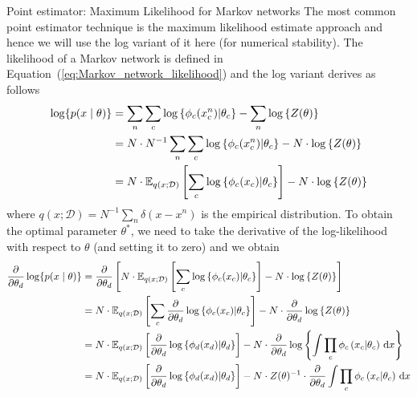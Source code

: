 \begin{topic}{.3cm}{Point estimator: Maximum Likelihood for Markov networks}
	The most common point estimator technique is the maximum likelihood estimate approach and hence we will use the log variant of it here (for numerical stability). %
	The likelihood of a Markov network is defined in Equation~(\ref{eq:Markov_network_likelihood}) and the log variant derives as follows %
	\begin{equation}
	\begin{aligned}
	\log\{p(x\mid\theta)\}
	&= \sum_n \sum_c \log\left\{ \phi_c(x_c^n) \middle| \theta_c \right\} - \sum_n \log\left\{ Z(\theta) \right\} \\
	&= N\cdot N^{-1} \sum_n \sum_c \log\left\{ \phi_c(x_c^n) \middle| \theta_c \right\} -  N\cdot \log\left\{ Z(\theta) \right\} \\
	&= N\cdot \E[q(x;\mathcal{D})]{\sum_c \log\left\{ \phi_c(x_c) \middle| \theta_c \right\}} -  N\cdot \log\left\{ Z(\theta) \right\} \\
	\end{aligned}
	\end{equation}
	where \ensuremath{q(x;\mathcal{D}) = N^{-1} \sum_n \delta(x-x^n)} is the empirical distribution. %
	To obtain the optimal parameter \ensuremath{\theta^*}, we need to take the derivative of the log-likelihood with respect to \ensuremath{\theta} (and setting it to zero) and we obtain %
	\begin{equation}
	\begin{aligned}
	\frac{\partial}{\partial\theta_d} \log\{p(x\mid\theta)\}
	&= \frac{\partial}{\partial\theta_d} \left[  N\cdot \E[q(x;\mathcal{D})]{\sum_c \log\left\{ \phi_c(x_c) \middle| \theta_c \right\}} -  N\cdot \log\left\{ Z(\theta) \right\}  \right] \\
	&= N\cdot \E[q(x;\mathcal{D})]{\sum_c \frac{\partial}{\partial\theta_d} \log\left\{ \phi_c(x_c) \middle| \theta_c \right\}} -  N\cdot \frac{\partial}{\partial\theta_d} \log\left\{ Z(\theta) \right\} \\
	&= N\cdot \E[q(x;\mathcal{D})]{\frac{\partial}{\partial\theta_d} \log\left\{ \phi_d(x_d) \middle| \theta_d \right\}} -  N\cdot \frac{\partial}{\partial\theta_d} \log\left\{ \int \prod_c \phi_c\left(x_c \middle| \theta_c \right) \,\mathrm{d}x \right\} \\
	&= N\cdot \E[q(x;\mathcal{D})]{\frac{\partial}{\partial\theta_d} \log\left\{ \phi_d(x_d) \middle| \theta_d \right\}} %
		- N\cdot Z(\theta)^{-1} \cdot \frac{\partial}{\partial\theta_d} \int \prod_c \phi_c\left(x_c \middle| \theta_c \right) \,\mathrm{d}x \\

\end{aligned}
\end{equation}
\end{topic}
